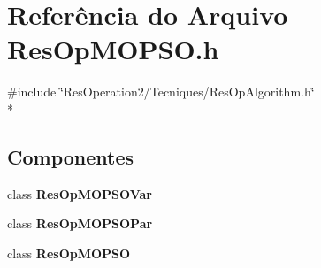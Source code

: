 \section{Referência do Arquivo Res\+Op\+M\+O\+P\+S\+O.\+h}
\label{_2_tecniques_2_m_o_p_s_o_2_res_op_m_o_p_s_o_8h}
{\ttfamily \#include \char`\"{}Res\+Operation2/\+Tecniques/\+Res\+Op\+Algorithm.\+h\char`\"{}}\\*
\subsection*{Componentes}
\begin{DoxyCompactItemize}
\item 
class {\bf Res\+Op\+M\+O\+P\+S\+O\+Var}
\item 
class {\bf Res\+Op\+M\+O\+P\+S\+O\+Par}
\item 
class {\bf Res\+Op\+M\+O\+P\+SO}
\end{DoxyCompactItemize}
